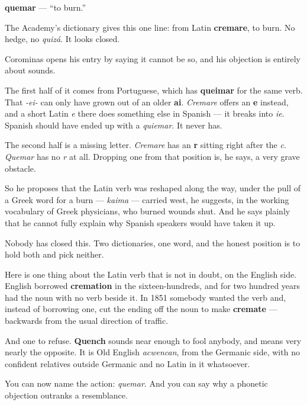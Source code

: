 \begin{cousinweb}
\textbf{quemar} — \textquotedblleft{}to burn.\textquotedblright{}

The Academy's dictionary gives this one line: from Latin \textbf{cremare}, to burn. No hedge, no \emph{quizá}. It looks closed.

Corominas opens his entry by saying it cannot be so, and his objection is entirely about sounds.

The first half of it comes from Portuguese, which has \textbf{queimar} for the same verb. That \emph{-ei-} can only have grown out of an older \textbf{ai}. \emph{Cremare} offers an \textbf{e} instead, and a short Latin \emph{e} there does something else in Spanish — it breaks into \emph{ie}. Spanish should have ended up with a \emph{quiemar}. It never has.

The second half is a missing letter. \emph{Cremare} has an \textbf{r} sitting right after the \emph{c}. \emph{Quemar} has no \emph{r} at all. Dropping one from that position is, he says, a very grave obstacle.

So he proposes that the Latin verb was reshaped along the way, under the pull of a Greek word for a burn — \emph{kaima} — carried west, he suggests, in the working vocabulary of Greek physicians, who burned wounds shut. And he says plainly that he cannot fully explain why Spanish speakers would have taken it up.

Nobody has closed this. Two dictionaries, one word, and the honest position is to hold both and pick neither.

Here is one thing about the Latin verb that is not in doubt, on the English side. English borrowed \textbf{cremation} in the sixteen-hundreds, and for two hundred years had the noun with no verb beside it. In 1851 somebody wanted the verb and, instead of borrowing one, cut the ending off the noun to make \textbf{cremate} — backwards from the usual direction of traffic.

And one to refuse. \textbf{Quench} sounds near enough to fool anybody, and means very nearly the opposite. It is Old English \emph{acwencan}, from the Germanic side, with no confident relatives outside Germanic and no Latin in it whatsoever.
\end{cousinweb}

\begin{grammarlens}[title={What you've built}]
You can now name the action: \emph{quemar}. And you can say why a phonetic objection outranks a resemblance.
\end{grammarlens}

